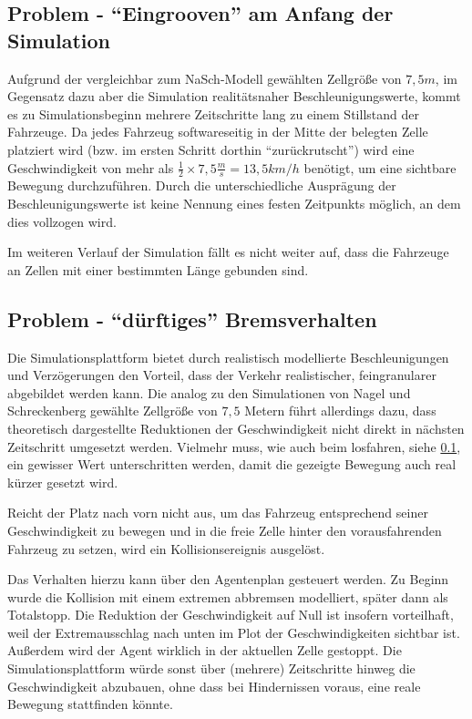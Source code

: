 \subsection{Problem - \enquote{Eingrooven} am Anfang der Simulation}
\label{sec:accelerategroove}

Aufgrund der vergleichbar zum NaSch-Modell gewählten Zellgröße von $7,5 m$, im Gegensatz dazu aber die Simulation realitätsnaher Beschleunigungswerte, kommt es zu Simulationsbeginn mehrere Zeitschritte lang zu einem Stillstand der Fahrzeuge.
Da jedes Fahrzeug softwareseitig in der Mitte der belegten Zelle platziert wird (bzw. im ersten Schritt dorthin \enquote{zurückrutscht}) wird eine Geschwindigkeit von mehr als $ \frac{1}{2} \times 7,5 \frac{m}{s} = 13,5 km/h$ benötigt, um eine sichtbare Bewegung durchzuführen.
Durch die unterschiedliche Ausprägung der Beschleunigungswerte ist keine Nennung eines festen Zeitpunkts möglich, an dem dies vollzogen wird.

Im weiteren Verlauf der Simulation fällt es nicht weiter auf, dass die Fahrzeuge an Zellen mit einer bestimmten Länge gebunden sind.



\subsection{Problem - \enquote{dürftiges} Bremsverhalten}

Die Simulationsplattform bietet durch realistisch modellierte Beschleunigungen und Verzögerungen den Vorteil, dass der Verkehr realistischer, feingranularer abgebildet werden kann.
Die analog zu den Simulationen von Nagel und Schreckenberg gewählte Zellgröße von $7,5$ Metern führt allerdings dazu, dass theoretisch dargestellte Reduktionen der Geschwindigkeit nicht direkt in nächsten Zeitschritt umgesetzt werden.
Vielmehr muss, wie auch beim losfahren, siehe \cref{sec:accelerategroove}, ein gewisser Wert unterschritten werden, damit die gezeigte Bewegung auch real kürzer gesetzt wird.

Reicht der Platz nach vorn nicht aus, um das Fahrzeug entsprechend seiner Geschwindigkeit zu bewegen und in die freie Zelle hinter den vorausfahrenden Fahrzeug zu setzen, wird ein Kollisionsereignis ausgelöst.

Das Verhalten hierzu kann über den Agentenplan gesteuert werden.
Zu Beginn wurde die Kollision mit einem extremen abbremsen modelliert, später dann als Totalstopp.
Die Reduktion der Geschwindigkeit auf Null ist insofern vorteilhaft, weil der Extremausschlag nach unten im Plot der Geschwindigkeiten sichtbar ist.
Außerdem wird der Agent wirklich in der aktuellen Zelle gestoppt. 
Die Simulationsplattform würde sonst über (mehrere) Zeitschritte hinweg die Geschwindigkeit abzubauen, ohne dass bei Hindernissen voraus, eine reale Bewegung stattfinden könnte. 

